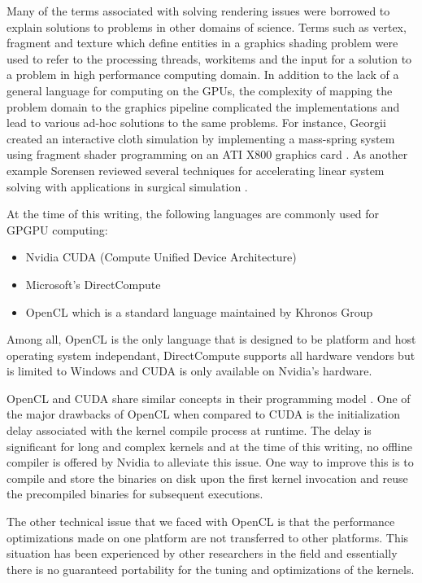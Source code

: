 Many of the terms associated with solving rendering issues were borrowed to explain solutions to problems in 
other domains of science. Terms such as vertex, fragment and texture which define entities in a graphics 
shading problem were used to refer to the processing threads, workitems and the input for a solution to a 
problem in high performance computing domain. In addition to the lack of a general language for computing on the GPUs, 
the complexity of mapping the problem domain to the graphics pipeline complicated the implementations and lead 
to various ad-hoc solutions to the same problems. For instance, Georgii \etal created an interactive cloth simulation 
by implementing a mass-spring system using fragment shader programming on an ATI X800 graphics card \cite{Georgii2005}. 
As another example Sorensen \etal reviewed several techniques for accelerating linear system solving
with applications in surgical simulation \cite{Sørensen2006a}. 

At the time of this writing, the following languages are commonly used for GPGPU computing:
\begin{itemize}
 \item Nvidia CUDA (Compute Unified Device Architecture)
 \item Microsoft's DirectCompute
 \item OpenCL which is a standard language maintained by Khronos Group
\end{itemize}

Among all, OpenCL is the only language that is designed to be platform and 
host operating system independant, DirectCompute supports all hardware vendors
but is limited to Windows and CUDA is only available on Nvidia's hardware. 

OpenCL and CUDA share similar concepts in their programming model \cite{gaster2012heterogeneous}.
One of the major drawbacks of OpenCL when compared to CUDA is the initialization delay 
associated with the kernel compile process at runtime. The delay is significant for long
and complex kernels and at the time of this writing, no offline compiler is offered by Nvidia
to alleviate this issue. One way to improve this is to compile and store the binaries 
on disk upon the first kernel invocation and reuse the precompiled binaries for subsequent 
executions. 

The other technical issue that we faced with OpenCL is that the performance optimizations 
made on one platform are not transferred to other platforms. This situation has been experienced
by other researchers in the field and essentially there is no guaranteed portability for the 
tuning and optimizations of the kernels.

